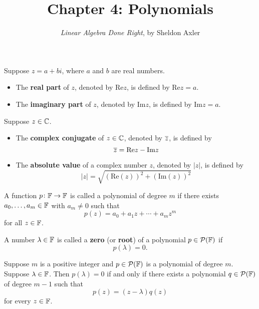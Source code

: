 \documentclass{extarticle}
\title{\vspace{-2em}Chapter 4: Polynomials}
\author{\emph{Linear Algebra Done Right}, by Sheldon Axler}
\date{}
\begin{document}
\maketitle 

\begin{definition}[Re z, Im z]
    Suppose \(z = a + b i\), where \(a\) and \(b\) are real numbers. 
    \begin{itemize}
        \item The \textbf{real part} of \(z\), denoted by Re\(z\), is defined by Re\(z=a\).
        \item The \textbf{imaginary part} of \(z\), denoted by Im\(z\), is defined by Im\(z=a\).
    \end{itemize}
\end{definition}


\begin{definition}
    Suppose \(z \in \mathbb{C}\). 
    \begin{itemize}
        \item The \textbf{complex conjugate} of \(z \in \mathbb{C}\), denoted by \(\overline{z}\), is defined by 
        \[\overline{z} = \text{Re}z - \text{Im}z\]
        \item The \textbf{absolute value} of a complex number \(z\), denoted by \(|z|\), is defined by 
        \[|z| = \sqrt{(\text{Re}(z))^2 + (\text{Im}(z))^2}\]
    \end{itemize}
\end{definition}

A function \(p \colon \mathbb{F} \to \mathbb{F}\) is called a polynomial of degree \(m\) if there exists 
\(a_0, \ldots, a_m \in \mathbb{F}\) with \(a_m \neq 0\) such that 
\[p(z) = a_0 + a_1z + \cdots + a_m z^m\]
for all \(z \in \mathbb{F}\). 

\begin{definition}
    A number \(\lambda \in \mathbb{F}\) is called a \textbf{zero} (or \textbf{root}) of a polynomial 
    \(p \in\mathcal{P}(\mathbb{F})\) if 
    \[p(\lambda) = 0.\]
\end{definition}


\begin{lemma}
    Suppose \(m\) is a positive integer and \(p \in \mathcal{P}(\mathbb{F})\) is a polynomial of degree \(m\). 
    Suppose \(\lambda \in \mathbb{F}\). Then \(p(\lambda) = 0\) if and only if there exists a polynomial 
    \(q \in \mathcal{P}(\mathbb{F})\) of degree \(m - 1\) such that 
    \[p(z) = (z - \lambda)q(z)\]
    for every \(z \in \mathbb{F}\). 
\end{lemma}
\end{document}
